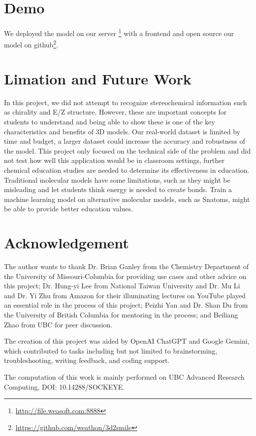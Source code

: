 \documentclass{article}
\begin{document}
\section{Demo}
We deployed the model on our server \footnote{\url{http://file.weasoft.com:8888}} with a frontend and open source our model on github\footnote{\url{https://github.com/weathon/3d2smile}}. 
\section{Limation and Future Work}
In this project, we did not attempt to recognize stereochemical information such as chirality and E/Z structure. However, these are important concepts for students to understand and being able to show these is one of the key characteristics and benefits of 3D models. 
Our real-world dataset is limited by time and budget, a larger dataset could increase the accuracy and robustness of the model. 
This project only focused on the technical side of the problem and did not test how well this application would be in classroom settings, further chemical education studies are needed to determine its effectiveness in education. 
Traditional molecular models have some limitations, such as they might be misleading and let students think energy is needed to create bonds\autocite{snatoms}. Train a machine learning model on alternative molecular models, such as Snatoms\autocite{snatoms}, might be able to provide better education values.
\section*{Acknowledgement}
The author wants to thank Dr. Brian Ganley from the Chemistry Department of the University of Missouri-Columbia for providing use cases and other advice on this project; Dr. Hung-yi Lee from National Taiwan University and Dr. Mu Li and Dr. Yi Zhu from Amazon for their illuminating lectures on YouTube played an essential role in the process of this project; Peizhi Yan and Dr. Shan Du from the University of British Columbia for mentoring in the process; and Beiliang Zhao from UBC for peer discussion.

The creation of this project was aided by OpenAI ChatGPT and Google Gemini, which contributed to tasks including but not limited to brainstorming, troubleshooting, writing feedback, and coding support.

The computation of this work is mainly performed on UBC Advanced Research Computing, DOI: 10.14288/SOCKEYE.

\printbibliography
\end{document}
